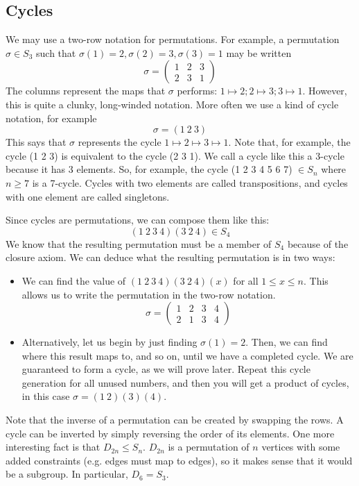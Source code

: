 \subsection{Cycles}
We may use a two-row notation for permutations. For example, a permutation \(\sigma \in S_3\) such that \(\sigma(1) = 2, \sigma(2) = 3, \sigma(3) = 1\) may be written
\[ \sigma = \begin{pmatrix}
		1 & 2 & 3 \\
		2 & 3 & 1
	\end{pmatrix} \]
The columns represent the maps that \(\sigma\) performs: \(1 \mapsto 2; 2 \mapsto 3; 3 \mapsto 1\). However, this is quite a clunky, long-winded notation. More often we use a kind of cycle notation, for example
\[ \sigma = (1\ 2\ 3) \]
This says that \(\sigma\) represents the cycle \(1 \mapsto 2 \mapsto 3 \mapsto 1\). Note that, for example, the cycle (1 2 3) is equivalent to the cycle (2 3 1). We call a cycle like this a 3-cycle because it has 3 elements. So, for example, the cycle (1 2 3 4 5 6 7) \(\in S_n\) where \(n \geq 7\) is a 7-cycle. Cycles with two elements are called transpositions, and cycles with one element are called singletons.

Since cycles are permutations, we can compose them like this:
\[ (1\ 2\ 3\ 4)(3\ 2\ 4) \in S_4 \]
We know that the resulting permutation must be a member of \(S_4\) because of the closure axiom. We can deduce what the resulting permutation is in two ways:
\begin{itemize}
	\item We can find the value of \((1\ 2\ 3\ 4)(3\ 2\ 4)(x)\) for all \(1 \leq x \leq n\). This allows us to write the permutation in the two-row notation.
	      \[ \sigma = \begin{pmatrix}
			      1 & 2 & 3 & 4 \\
			      2 & 1 & 3 & 4
		      \end{pmatrix} \]
	\item Alternatively, let us begin by just finding \(\sigma(1) = 2\). Then, we can find where this result maps to, and so on, until we have a completed cycle. We are guaranteed to form a cycle, as we will prove later. Repeat this cycle generation for all unused numbers, and then you will get a product of cycles, in this case \(\sigma = (1\ 2)(3)(4)\).
\end{itemize}
Note that the inverse of a permutation can be created by swapping the rows. A cycle can be inverted by simply reversing the order of its elements. One more interesting fact is that \(D_{2n} \leq S_n\). \(D_{2n}\) is a permutation of \(n\) vertices with some added constraints (e.g. edges must map to edges), so it makes sense that it would be a subgroup. In particular, \(D_6 = S_3\).

